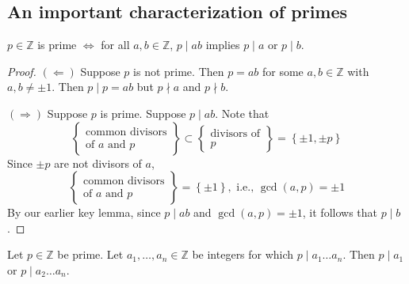 \documentclass[11pt]{article}
\begin{document}
\subsection{An important characterization of primes}
\begin{theorem}
    \(p \in \mathbb{Z}\) is prime \(\Leftrightarrow\) for all \(a, b \in \mathbb{Z}\), \(p \mid ab\) implies \(p \mid a\) or \(p \mid b\).
\end{theorem}

\begin{proof}
    \((\Leftarrow)\) Suppose \(p\) is not prime. Then \(p = ab\) for some \(a, b \in \mathbb{Z}\) with \(a, b \neq \pm 1\). Then \(p \mid p = ab\) but \(p \nmid a\) and \(p \nmid b\).

    \((\Rightarrow)\) Suppose \(p\) is prime. Suppose \(p \mid ab\). Note that
    \[
        \left\{
        \begin{array}{l}
            \text{common divisors} \\
            \text{of } a \text{ and } p
        \end{array}
        \right\}
        \subset
        \left\{
        \begin{array}{l}
            \text{divisors of} \\
            p
        \end{array}
        \right\}
        =
        \left\{
        \pm 1, \pm p
        \right\}
    \]
    Since \(\pm p\) are not divisors of \(a\),
    \[
        \left\{
        \begin{array}{l}
            \text{common divisors} \\
            \text{of } a \text{ and } p
        \end{array}
        \right\}
        =
        \left\{
        \pm 1
        \right\}, \text{ i.e., } \operatorname{gcd}(a, p) = \pm 1
    \]
    By our earlier key lemma, since \(p \mid ab\) and \(\operatorname{gcd}(a, p) =
    \pm 1\), it follows that \(p \mid b\).
\end{proof}
\begin{theorem}
    Let \(p \in \mathbb{Z}\) be prime. Let \(a_1, \ldots, a_n \in \mathbb{Z}\) be integers for which \(p \mid a_1 \ldots a_n\). Then \(p \mid a_1\) or \(p \mid a_2 \ldots a_n\).
\end{theorem}
\end{document}
